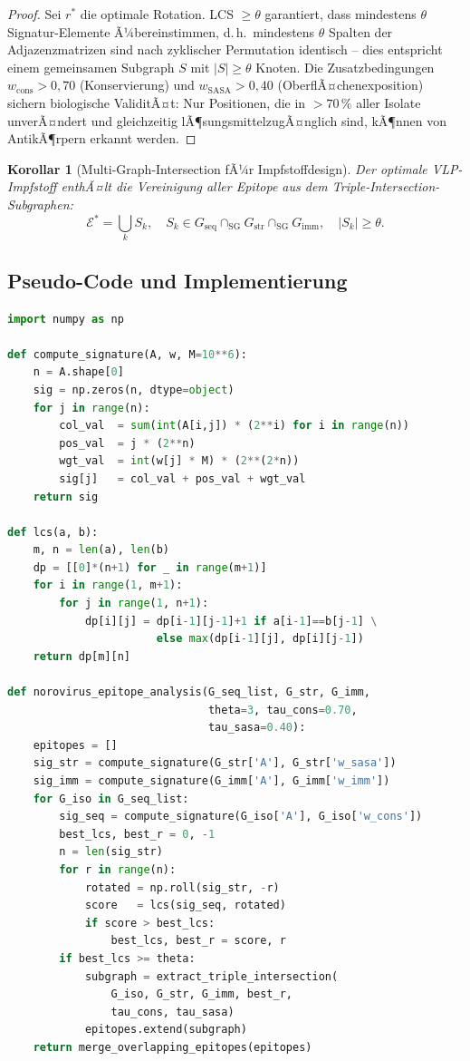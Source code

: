 ﻿\documentclass[a4paper,12pt]{article}
\theoremstyle{plain}
\newtheorem{korollar}[satz]{Korollar}
\theoremstyle{definition}
\theoremstyle{remark}
\begin{document}
\begin{proof}
Sei $r^*$ die optimale Rotation. LCS $\geq \theta$ garantiert, dass mindestens $\theta$
Signatur-Elemente Ã¼bereinstimmen, d.\,h.\ mindestens $\theta$ Spalten der Adjazenzmatrizen
sind nach zyklischer Permutation identisch -- dies entspricht einem gemeinsamen Subgraph
$S$ mit $|S| \geq \theta$ Knoten. Die Zusatzbedingungen $w_{\text{cons}}>0{,}70$
(Konservierung) und $w_{\text{SASA}}>0{,}40$ (OberflÃ¤chenexposition) sichern
biologische ValiditÃ¤t: Nur Positionen, die in $>70\,\%$ aller Isolate unverÃ¤ndert
und gleichzeitig lÃ¶sungsmittelzugÃ¤nglich sind, kÃ¶nnen von AntikÃ¶rpern erkannt werden.
\end{proof}

\begin{korollar}[Multi-Graph-Intersection fÃ¼r Impfstoffdesign]\label{kor:multi}
Der optimale VLP-Impfstoff enthÃ¤lt die Vereinigung aller Epitope aus dem
\emph{Triple-Intersection-Subgraphen}:
\[
  \mathcal{E}^* = \bigcup_{k} S_k,\quad
  S_k \in G_{\text{seq}} \cap_{\mathrm{SG}} G_{\text{str}} \cap_{\mathrm{SG}} G_{\text{imm}},
  \quad |S_k|\geq\theta.
\]
\end{korollar}

\subsection{Pseudo-Code und Implementierung}

\begin{lstlisting}[language=Python,
  caption={Subgraph-Analyse fÃ¼r Norovirus-Epitop-Identifikation},
  label=lst:subgraph]
import numpy as np

def compute_signature(A, w, M=10**6):
    n = A.shape[0]
    sig = np.zeros(n, dtype=object)
    for j in range(n):
        col_val  = sum(int(A[i,j]) * (2**i) for i in range(n))
        pos_val  = j * (2**n)
        wgt_val  = int(w[j] * M) * (2**(2*n))
        sig[j]   = col_val + pos_val + wgt_val
    return sig

def lcs(a, b):
    m, n = len(a), len(b)
    dp = [[0]*(n+1) for _ in range(m+1)]
    for i in range(1, m+1):
        for j in range(1, n+1):
            dp[i][j] = dp[i-1][j-1]+1 if a[i-1]==b[j-1] \
                       else max(dp[i-1][j], dp[i][j-1])
    return dp[m][n]

def norovirus_epitope_analysis(G_seq_list, G_str, G_imm,
                               theta=3, tau_cons=0.70,
                               tau_sasa=0.40):
    epitopes = []
    sig_str = compute_signature(G_str['A'], G_str['w_sasa'])
    sig_imm = compute_signature(G_imm['A'], G_imm['w_imm'])
    for G_iso in G_seq_list:
        sig_seq = compute_signature(G_iso['A'], G_iso['w_cons'])
        best_lcs, best_r = 0, -1
        n = len(sig_str)
        for r in range(n):
            rotated = np.roll(sig_str, -r)
            score   = lcs(sig_seq, rotated)
            if score > best_lcs:
                best_lcs, best_r = score, r
        if best_lcs >= theta:
            subgraph = extract_triple_intersection(
                G_iso, G_str, G_imm, best_r,
                tau_cons, tau_sasa)
            epitopes.extend(subgraph)
    return merge_overlapping_epitopes(epitopes)
\end{lstlisting}
\end{document}
